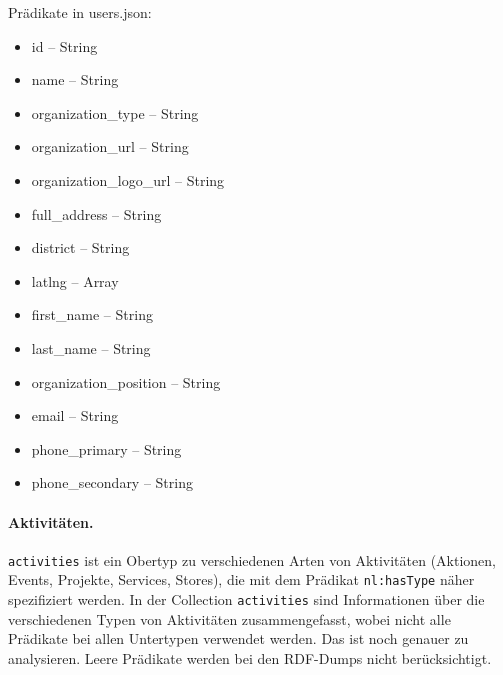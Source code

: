 \documentclass[a4paper,11pt]{article}
\begin{document}
Prädikate in users.json:
\begin{itemize}\itemsep0pt
  \item id -- String
  \item name -- String
  \item organization\_type -- String
  \item organization\_url -- String
  \item organization\_logo\_url -- String
  \item full\_address -- String
  \item district -- String
  \item latlng -- Array
  \item first\_name -- String
  \item last\_name -- String
  \item organization\_position -- String
  \item email -- String
  \item phone\_primary -- String
  \item phone\_secondary -- String
\end{itemize}

\paragraph{Aktivitäten.}
\texttt{activities} ist ein Obertyp zu verschiedenen Arten von Aktivitäten
(Aktionen, Events, Projekte, Services, Stores), die mit dem Prädikat
\texttt{nl:hasType} näher spezifiziert werden.  In der Collection
\texttt{activities} sind Informationen über die verschiedenen Typen von
Aktivitäten zusammengefasst, wobei nicht alle Prädikate bei allen Untertypen
verwendet werden. Das ist noch genauer zu analysieren.  Leere Prädikate werden
bei den RDF-Dumps nicht berücksichtigt.
\end{document}
